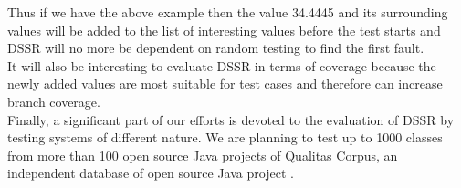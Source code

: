 \documentclass[10pt, conference, compsocconf]{IEEEtran}
\begin{document}
Thus if we have the above example then the value 34.4445 and its surrounding values will be added to the list of interesting values before the test starts and DSSR will no more be dependent on random testing to find the first fault.\\

It will also be interesting to evaluate DSSR in terms of coverage because the newly added values are most suitable for test cases and therefore can increase branch coverage. \\

Finally, a significant part of our efforts is devoted to the evaluation of DSSR by testing systems of different nature. We are planning to test up to 1000 classes from more than 100 open source Java projects of Qualitas Corpus, an independent database of open source Java project \cite{Tempero2010}. \\










%
%
%

\end{document}
